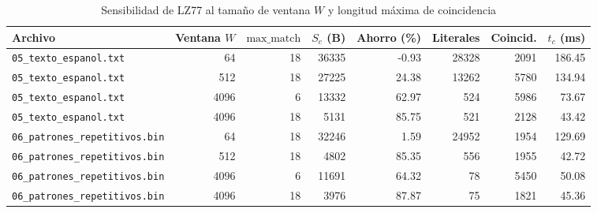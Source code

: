 \begin{table}[H]\centering\scriptsize
\caption{Sensibilidad de LZ77 al tamaño de ventana $W$ y longitud máxima de coincidencia}\label{tab:lz77_sens}
\setlength{\tabcolsep}{4.5pt}
\begin{tabular}{@{}lrrrrrrr@{}}\toprule
Archivo & Ventana $W$ & $\text{max\_match}$ & $S_c$ (B) & Ahorro (\%) & Literales & Coincid. & $t_c$ (ms) \\ \midrule
\texttt{05\_texto\_espanol.txt} & 64 & 18 & 36335 & -0.93 & 28328 & 2091 & 186.45 \\
\texttt{05\_texto\_espanol.txt} & 512 & 18 & 27225 & 24.38 & 13262 & 5780 & 134.94 \\
\texttt{05\_texto\_espanol.txt} & 4096 & 6 & 13332 & 62.97 & 524 & 5986 & 73.67 \\
\texttt{05\_texto\_espanol.txt} & 4096 & 18 & 5131 & 85.75 & 521 & 2128 & 43.42 \\
\texttt{06\_patrones\_repetitivos.bin} & 64 & 18 & 32246 & 1.59 & 24952 & 1954 & 129.69 \\
\texttt{06\_patrones\_repetitivos.bin} & 512 & 18 & 4802 & 85.35 & 556 & 1955 & 42.72 \\
\texttt{06\_patrones\_repetitivos.bin} & 4096 & 6 & 11691 & 64.32 & 78 & 5450 & 50.08 \\
\texttt{06\_patrones\_repetitivos.bin} & 4096 & 18 & 3976 & 87.87 & 75 & 1821 & 45.36 \\
\bottomrule\end{tabular}\end{table}
